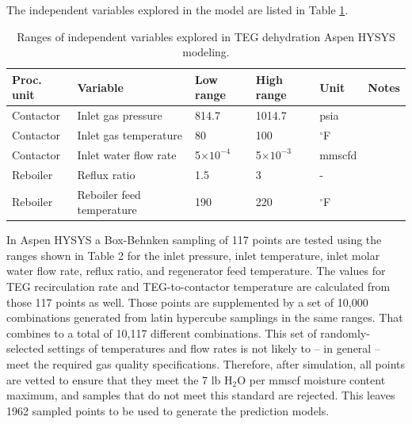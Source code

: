\documentclass[11pt]{report}
\begin{document}
The independent variables explored in the model are listed in Table \ref{tab:TEG_Aspen_Variables}.

\begin{table}
\begin{scriptsize}
\caption{Ranges of independent variables explored in TEG dehydration Aspen HYSYS modeling.}
\label{tab:TEG_Aspen_Variables}
\begin{tabular*}{1\columnwidth}{p{}p{}p{}p{}p{}p{}}
\toprule
Proc. unit & Variable 				& Low range 	& High range 				& Unit 		& Notes \\
\midrule
Contactor &	Inlet gas pressure 		&	814.7 	& 1014.7				& psia	 	&\\
Contactor &	Inlet gas temperature 	&	80	 	&	100 				& $^\circ$F	 			& \\
Contactor &	Inlet water flow rate 		&	5$\times 10^{-4}$ 		& 5$\times 10^{-3}$  	& mmscfd 	&\\
Reboiler 	&	Reflux ratio 			&	1.5		&	3 				& -				& \\
Reboiler 	&	Reboiler feed temperature &	190		&	220 				& $^\circ$F				& \\
\bottomrule
\end{tabular*}
\end{scriptsize}
\end{table}

In Aspen HYSYS a Box-Behnken sampling of 117 points are tested using the ranges shown in Table 2 for the inlet pressure, inlet temperature, inlet molar water flow rate, reflux ratio, and regenerator feed temperature. The values for TEG recirculation rate and TEG-to-contactor temperature are calculated from those 117 points as well. Those points are supplemented by a set of 10,000 combinations generated from latin hypercube samplings in the same ranges. That combines to a total of 10,117 different combinations. This set of randomly-selected settings of temperatures and flow rates is not likely to -- in general -- meet the required gas quality specifications. Therefore, after simulation, all points are vetted to ensure that they meet the 7 lb H$_2$O per mmscf moisture content maximum, and samples that do not meet this standard are rejected. This leaves 1962 sampled points to be used to generate the prediction models. 
\end{document}
